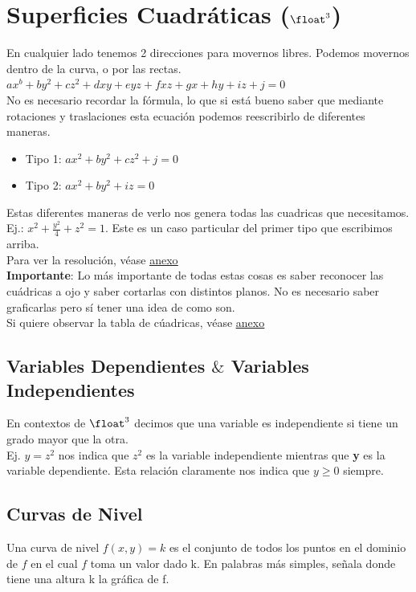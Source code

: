 \documentclass[10pt,a4paper]{article}
\begin{document}
\section*{Superficies Cuadráticas ($\float^{3}$)}
En cualquier lado tenemos 2 direcciones para movernos libres. Podemos movernos dentro de la curva, o por las rectas. \\
$ax^{b} + by^{2} + cz^{2} + dxy + eyz + fxz + gx + hy + iz + j = 0$ \\
No es necesario recordar la fórmula, lo que si está bueno saber que mediante rotaciones y traslaciones esta ecuación podemos reescribirlo de diferentes maneras. 
\begin{itemize}
    \item Tipo 1: $ax^{2} + by^{2} + cz^{2} + j = 0$
    \item Tipo 2: $ax^{2} + by^{2} + iz = 0$
\end{itemize}
Estas diferentes maneras de verlo nos genera todas las cuadricas que necesitamos. \\
Ej.: $x^{2} + \frac{y^{2}}{4} + z^{2} = 1$. Este es un caso particular del primer tipo que escribimos arriba. \\
Para ver la resolución, véase \hyperref[subsec:trazas_superficies]{\underline{anexo}} \\
\textbf{Importante}: Lo más importante de todas estas cosas es saber reconocer las cuádricas a ojo y saber cortarlas con distintos planos. No es necesario saber graficarlas pero sí tener una idea de como son. \\
Si quiere observar la tabla de cúadricas, véase \hyperref[subsec:tabla_cuadricas]{\underline{anexo}}
\subsection*{Variables Dependientes $\&$ Variables Independientes}
En contextos de $\float^{3}$ decimos que una variable es independiente si tiene un grado mayor que la otra. \\
Ej. $y = z^{2}$ nos indica que $z^{2}$ es la variable independiente mientras que \textbf{y} es la variable dependiente. Esta relación claramente nos indica que $y \ge 0 $ siempre.
\subsection*{Curvas de Nivel}
Una curva de nivel $f(x,y) = k$ es el conjunto de todos los puntos en el dominio de $f$ en el cual $f$ toma un valor dado k. En palabras más simples, señala donde tiene una altura k la gráfica de f. \\
\end{document}
